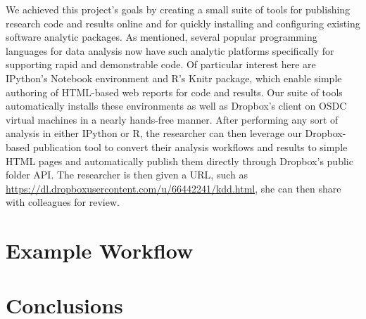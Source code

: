 \documentclass[10pt,a4]{article}
\begin{document}
We achieved this project's goals by creating a small suite of tools for publishing research code and results online and for quickly installing and configuring existing software analytic packages.
As mentioned, several popular programming languages for data analysis now have such analytic platforms specifically for supporting rapid and demonstrable code.
Of particular interest here are IPython's Notebook environment and R's Knitr package, which enable simple authoring of HTML-based web reports for code and results.
Our suite of tools automatically installs these environments as well as Dropbox's client on OSDC virtual machines in a nearly hands-free manner.
After performing any sort of analysis in either IPython or R, the researcher can then leverage our Dropbox-based publication tool to convert their analysis workflows and results to simple HTML pages and automatically publish them directly through Dropbox's public folder API.
The researcher is then given a URL, such as \url{https://dl.dropboxusercontent.com/u/66442241/kdd.html}, she can then share with colleagues for review.

\section{Example Workflow}

\section{Conclusions}
\end{document}
